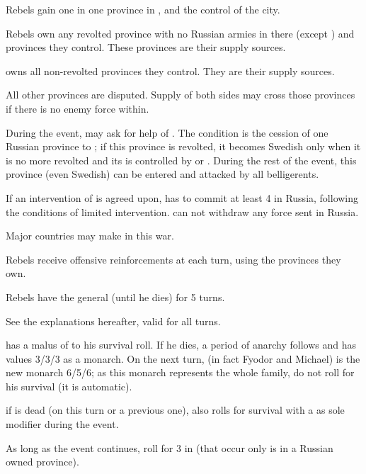 \aparag Rebels gain one \ARMY\faceplus in one province in \REVOLT, and the
control of the city.

\aparag Rebels own any revolted province with no Russian armies in there
(except ) and provinces they control. These provinces are
their supply sources.

\aparag \RUS owns all non-revolted provinces they control. They are their
supply sources.

\aparag All other provinces are disputed. Supply of both sides may cross those
provinces if there is no enemy force within.

\phdipl

\aparag During the event, \RUS may ask for help of \SUE. The condition is the
cession of one Russian province to \SUE; if this province is revolted, it
becomes Swedish only when it is no more revolted and its is controlled by \RUS
or \SUE. During the rest of the event, this province (even Swedish) can be
entered and attacked by all belligerents.

\bparag If an intervention of \SUE is agreed upon, \SUE has to commit at least
4 \LD in Russia, following the conditions of limited intervention.  \SUE can
not withdraw any force sent in Russia.

\aparag Major countries may make  in this war.

\phadm

\aparag Rebels receive offensive reinforcements at each turn, using the
provinces they own.

\aparag Rebels have the general \leaderDmitry (until he dies) for 5 turns.

\phpaix

\aparag See the explanations hereafter, valid for all turns.


\phevnt

\aparag {} has a malus of  to his survival
roll. If he dies, a period of anarchy follows and \RUS has values 3/3/3 as a
monarch. On the next turn, \monarqueRomanov (in fact Fyodor and Michael) is
the new monarch 6/5/6; as this monarch represents the whole family, do not
roll for his survival (it is automatic).

\aparag if  is dead (on this turn or a previous one),
\leaderDmitry also rolls for survival with a  as sole modifier
during the event.

\aparag As long as the event continues, roll for 3 \REVOLT in \RUS (that occur
only is in a Russian owned province).

